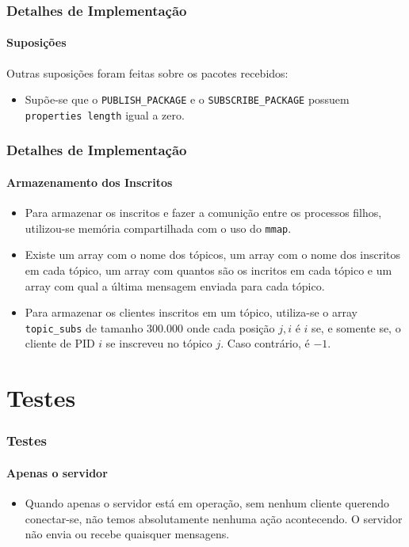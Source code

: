 \documentclass[10pt]{beamer}
\begin{document}
    \begin{frame}[t]
      \frametitle{Detalhes de Implementação}
      \framesubtitle{Suposições}
        Outras suposições foram feitas sobre os pacotes recebidos:
        \begin{itemize}
          \item Supõe-se que o \texttt{PUBLISH\_PACKAGE} e o
            \texttt{SUBSCRIBE\_PACKAGE} possuem \texttt{properties length} igual
            a zero.
        \end{itemize}
    \end{frame}

    \begin{frame}[t]
      \frametitle{Detalhes de Implementação}
      \framesubtitle{Armazenamento dos Inscritos}
      \begin{itemize}
        \item Para armazenar os inscritos e fazer a comunição entre os processos
          filhos, utilizou-se memória compartilhada com o uso do \texttt{mmap}.
        \item Existe um array com o nome dos tópicos, um array com o nome dos
          inscritos em cada tópico, um array com quantos são os incritos em cada
          tópico e um array com qual a última mensagem enviada para cada tópico.
        \item Para armazenar os clientes inscritos em um tópico, utiliza-se o
          array \texttt{topic\_subs} de tamanho $300.000$ onde cada posição
          $j,i$ é $i$ se, e somente se, o cliente de PID $i$ se inscreveu no
          tópico $j$. Caso contrário, é $-1$.
      \end{itemize}
    \end{frame}

    \section{Testes}
    \begin{frame}[t]
      \frametitle{Testes}
      \framesubtitle{Apenas o servidor}
      \begin{itemize}
        \item Quando apenas o servidor está em operação, sem nenhum cliente
          querendo conectar-se, não temos absolutamente nenhuma ação
          acontecendo. O servidor não envia ou recebe quaisquer mensagens.
      \end{itemize}
    \end{frame}
\end{document}
